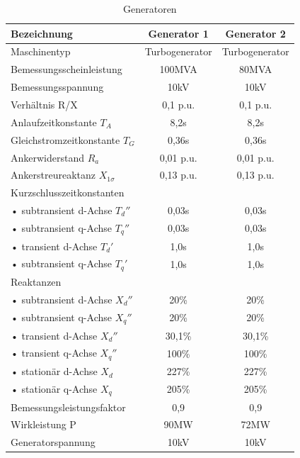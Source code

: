 \begin{table}[H]

\begin{tabular}{|l|c|c|}
\hline 
\textbf{Bezeichnung} & \textbf{Generator 1} & \textbf{Generator 2} \\ 
\hline 
Maschinentyp & Turbogenerator & Turbogenerator \\ 
\hline 
Bemessungsscheinleistung & 100MVA & 80MVA \\ 
\hline 
Bemessungsspannung & 10kV & 10kV \\ 
\hline 
Verhältnis R/X & 0,1 p.u. & 0,1 p.u. \\ 
\hline 
Anlaufzeitkonstante $T_A$ & 8,2s & 8,2s \\
\hline
Gleichstromzeitkonstante $T_G$ & 0,36s & 0,36s \\
\hline
Ankerwiderstand $R_a$ & 0,01 p.u. & 0,01 p.u. \\
\hline
Ankerstreureaktanz $X_{1\sigma}$ & 0,13 p.u. & 0,13 p.u. \\
\hline
\multicolumn{3}{|l|}{Kurzschlusszeitkonstanten} \\
\hline
• subtransient d-Achse $T_d''$ & 0,03s & 0,03s \\
\hline
• subtransient q-Achse $T_q''$ & 0,03s & 0,03s \\
\hline
• transient d-Achse $T_d'$ & 1,0s & 1,0s \\
\hline
• subtransient q-Achse $T_q'$ & 1,0s & 1,0s \\
\hline
\multicolumn{3}{|l|}{Reaktanzen} \\
\hline
• subtransient d-Achse $X_{d}''$ & 20\% & 20\% \\ 
\hline
• subtransient q-Achse $X_q''$ & 20\% & 20\% \\
\hline
• transient d-Achse $X_{d}''$ & 30,1\% & 30,1\% \\ 
\hline
• transient q-Achse $X_q''$ & 100\% & 100\% \\
\hline
• stationär d-Achse $X_d$ & 227\% & 227\% \\
\hline
• stationär q-Achse $X_q$ & 205\% & 205\% \\
\hline
Bemessungsleistungsfaktor & 0,9 & 0,9 \\ 
\hline 
Wirkleistung P & 90MW & 72MW \\ 
\hline 
Generatorspannung & 10kV & 10kV \\ 
\hline
\end{tabular}

\caption{Generatoren}
\end{table}


